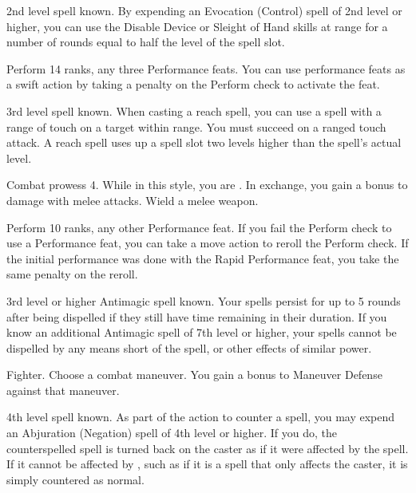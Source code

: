 \featpre 2nd level spell known.
\featben By expending an Evocation (Control) spell of 2nd level or higher, you can use the Disable Device or Sleight of Hand skills at \rngclose range for a number of rounds equal to half the level of the spell slot.

\featpres Perform 14 ranks, any three Performance feats.
\featben You can use performance feats as a swift action by taking a  penalty on the Perform check to activate the feat.

\featpre 3rd level spell known.
\featben When casting a reach spell, you can use a spell with a range of touch on a target within \rngclose range.
You must succeed on a ranged touch attack.
A reach spell uses up a spell slot two levels higher than the spell's actual level.

\featpre Combat prowess 4.
\featben While in this style, you are .
In exchange, you gain a  bonus to damage with melee attacks.
\stylereq Wield a melee weapon.

\featpres Perform 10 ranks, any other Performance feat.
\featben If you fail the Perform check to use a Performance feat, you can take a move action to reroll the Perform check.
If the initial performance was done with the Rapid Performance feat, you take the same  penalty on the reroll.

\featpre 3rd level or higher Antimagic spell known.
\featben Your spells persist for up to 5 rounds after being dispelled if they still have time remaining in their duration.
If you know an additional Antimagic spell of 7th level or higher, your spells cannot be dispelled by any means short of the  spell, or other effects of similar power.

\featpre Fighter.
\featben Choose a combat maneuver.
You gain a  bonus to Maneuver Defense against that maneuver.

\featpre 4th level spell known.
\featben As part of the action to counter a spell, you may expend an Abjuration (Negation) spell of 4th level or higher.
If you do, the counterspelled spell is turned back on the caster as if it were affected by the 
spell.
If it cannot be affected by , such as if it is a spell that only affects the caster, it is simply countered as normal.

